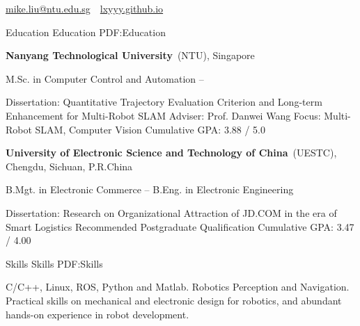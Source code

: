 \documentclass[letterpaper,MMMyyyy,nonstopmode]{simpleresumecv}
\newcommand{\CVAuthor}{Mike Xiangyu Liu}
\begin{document}

\Title{\CVAuthor}

\begin{SubTitle}
\par
\href{mike.liu@ntu.edu.sg}
{mike.liu@ntu.edu.sg}
\,\SubBulletSymbol\,
\href{https://lxyyy.github.io/}
{lxyyy.github.io}
\end{SubTitle}

\begin{Body}


\Section
{Education}
{Education}
{PDF:Education}

\Entry
{\textbf{Nanyang Technological University}~(NTU)},
Singapore

\BulletItem
M.Sc. in
{Computer Control and Automation}
\hfill
{} --
\begin{Detail}
\SubBulletItem
Dissertation:
{Quantitative Trajectory Evaluation Criterion and Long-term Enhancement for Multi-Robot SLAM\cite{xiangyu2019quantitative}}
\SubBulletItem
Adviser:
Prof. Danwei Wang
\SubBulletItem
Focus:
Multi-Robot SLAM, Computer Vision
\SubBulletItem
Cumulative GPA: 3.88 / 5.0
\end{Detail}

\BigGap
\Entry
{\textbf{University of Electronic Science and Technology of China}~(UESTC)},
Chengdu, Sichuan, P.R.China

\BulletItem
B.Mgt. in 
{Electronic Commerce}
\hfill
{} --
\BulletItem
B.Eng. in 
{Electronic Engineering}
\begin{Detail}
\SubBulletItem
Dissertation:
	{Research on Organizational Attraction of JD.COM in the era of Smart Logistics \cite{lxybachelor2018}}
\SubBulletItem
Recommended Postgraduate Qualification
\SubBulletItem
Cumulative GPA: 3.47 / 4.00
\end{Detail}


\Section
{Skills}
{Skills}
{PDF:Skills}

\Entry
\BulletItem
C/C++, Linux, ROS, Python and Matlab.
\BulletItem
Robotics Perception and Navigation.
\BulletItem
Practical skills on mechanical and electronic design for robotics, and abundant hands-on experience in robot development.



\end{Body}
\end{document}
